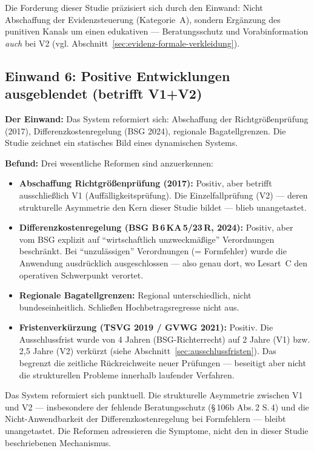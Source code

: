 \documentclass{umbruch-position}
\begin{document}
\noindent Die Forderung dieser Studie präzisiert sich durch den Einwand: Nicht Abschaffung der Evidenzsteuerung (Kategorie~A), sondern Ergänzung des punitiven Kanals um einen edukativen --- Beratungsschutz und Vorabinformation \textit{auch} bei V2 (vgl. Abschnitt~\ref{sec:evidenz-formale-verkleidung}).

\subsection{Einwand 6: Positive Entwicklungen ausgeblendet (betrifft V1+V2)}

\textbf{Der Einwand:} Das System reformiert sich: Abschaffung der Richtgrößenprüfung (2017), Differenzkostenregelung (BSG 2024), regionale Bagatellgrenzen. Die Studie zeichnet ein statisches Bild eines dynamischen Systems.

\textbf{Befund:} Drei wesentliche Reformen sind anzuerkennen:

\begin{itemize}[nosep]
  \item \textbf{Abschaffung Richtgrößenprüfung (2017):} Positiv, aber betrifft ausschließlich V1 (Auffälligkeitsprüfung). Die Einzelfallprüfung (V2) --- deren strukturelle Asymmetrie den Kern dieser Studie bildet --- blieb unangetastet.
  \item \textbf{Differenzkostenregelung (BSG B\,6\,KA\,5/23\,R, 2024):} Positiv, aber vom BSG explizit auf ``wirtschaftlich unzweckmäßige'' Verordnungen beschränkt. Bei ``unzulässigen'' Verordnungen (= Formfehler) wurde die Anwendung ausdrücklich ausgeschlossen --- also genau dort, wo Lesart~C den operativen Schwerpunkt verortet.
  \item \textbf{Regionale Bagatellgrenzen:} Regional unterschiedlich, nicht bundeseinheitlich. Schließen Hochbetragsregresse nicht aus.
  \item \textbf{Fristenverkürzung (TSVG 2019 / GVWG 2021):} Positiv. Die Ausschlussfrist wurde von 4 Jahren (BSG-Richterrecht) auf 2 Jahre (V1) bzw. 2,5 Jahre (V2) verkürzt (siehe Abschnitt~\ref{sec:ausschlussfristen}). Das begrenzt die zeitliche Rückreichweite neuer Prüfungen --- beseitigt aber nicht die strukturellen Probleme innerhalb laufender Verfahren.
\end{itemize}

Das System reformiert sich punktuell. Die strukturelle Asymmetrie zwischen V1 und V2 --- insbesondere der fehlende Beratungsschutz (\S\,106b Abs.\,2 S.\,4) und die Nicht-Anwendbarkeit der Differenzkostenregelung bei Formfehlern --- bleibt unangetastet. Die Reformen adressieren die Symptome, nicht den in dieser Studie beschriebenen Mechanismus.
\end{document}
